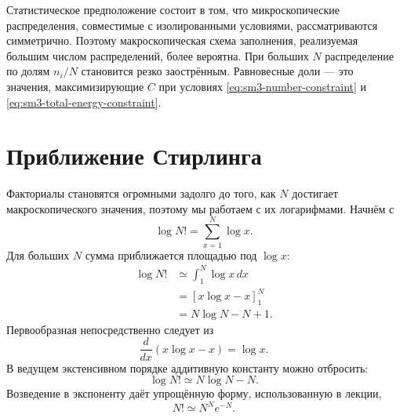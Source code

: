 \begin{classroomqa}
\end{classroomqa}

Статистическое предположение состоит в том, что микроскопические распределения, совместимые с изолированными условиями, рассматриваются симметрично. Поэтому макроскопическая схема заполнения, реализуемая большим числом распределений, более вероятна. При больших
\(N\) распределение по долям \(n_i/N\) становится резко заострённым.
Равновесные доли — это значения, максимизирующие \(C\) при условиях
\eqref{eq:sm3-number-constraint} и
\eqref{eq:sm3-total-energy-constraint}.

\section{Приближение Стирлинга}

Факториалы становятся огромными задолго до того, как \(N\) достигает макроскопического значения, поэтому мы работаем с их логарифмами. Начнём с
\begin{equation}
 \log N!=\sum_{x=1}^{N}\log x.
 \label{eq:sm3-log-factorial-sum}
\end{equation}
Для больших \(N\) сумма приближается площадью под \(\log x\):
\begin{align}
 \log N!
 &\simeq\int_1^N\log x\,dx\\
 &=\left[x\log x-x\right]_1^N\\
 &=N\log N-N+1.
 \label{eq:sm3-stirling-integral}
\end{align}
Первообразная непосредственно следует из
\[
 \frac{d}{dx}(x\log x-x)=\log x.
\]
В ведущем экстенсивном порядке аддитивную константу можно отбросить:
\begin{equation}
 \log N!\simeq N\log N-N.
 \label{eq:sm3-stirling-log}
\end{equation}
Возведение в экспоненту даёт упрощённую форму, использованную в лекции,
\begin{equation}
 N!\simeq N^N e^{-N}.
 \label{eq:sm3-stirling-simple}
\end{equation}

